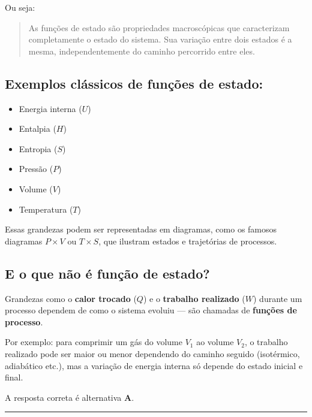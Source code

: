\documentclass[a4paper,12pt]{article}
\begin{document}
\begin{flushleft}
Ou seja:
\begin{quote}
As funções de estado são propriedades macroscópicas que caracterizam completamente o estado do sistema. Sua variação entre dois estados é a mesma, independentemente do caminho percorrido entre eles.
\end{quote}

\subsection*{Exemplos clássicos de funções de estado:}
\begin{itemize}
    \item Energia interna (\(U\))
    \item Entalpia (\(H\))
    \item Entropia (\(S\))
    \item Pressão (\(P\))
    \item Volume (\(V\))
    \item Temperatura (\(T\))
\end{itemize}

Essas grandezas podem ser representadas em diagramas, como os famosos diagramas \(P \times V\) ou \(T \times S\), que ilustram estados e trajetórias de processos.

\subsection*{E o que não é função de estado?}

Grandezas como o \textbf{calor trocado} (\(Q\)) e o \textbf{trabalho realizado} (\(W\)) durante um processo dependem de 
como o sistema evoluiu — são chamadas de \textbf{funções de processo}.

Por exemplo: para comprimir um gás do volume \(V_1\) ao volume \(V_2\), o trabalho realizado pode ser maior ou menor 
dependendo do caminho seguido (isotérmico, adiabático etc.), mas a variação de energia interna só depende do estado inicial e final.

A resposta correta é alternativa \colorbox{green!50}{\textbf{A}}.
\end{flushleft}

\noindent\rule{\linewidth}{0.6pt}\\
\end{document}
